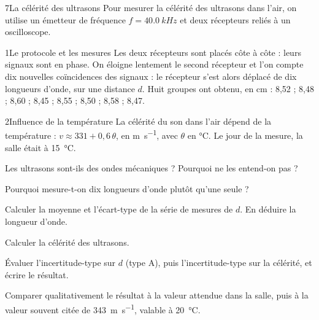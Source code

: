 

\begin{exoBac}{7}{La célérité des ultrasons}
Pour mesurer la célérité des ultrasons dans l'air, on utilise un émetteur de fréquence $f=\qty{40,0}{kHz}$ et deux récepteurs reliés à
un oscilloscope.
\begin{docu}{1}{Le protocole et les mesures}
Les deux récepteurs sont placés côte à côte : leurs signaux sont en phase. On éloigne lentement le second récepteur et l'on compte
dix nouvelles coïncidences des signaux : le récepteur s'est alors déplacé de dix longueurs d'onde, sur une distance $d$. Huit
groupes ont obtenu, en cm : 8,52 ; 8,48 ; 8,60 ; 8,45 ; 8,55 ; 8,50 ; 8,58 ; 8,47.
\end{docu}
\begin{docu}{2}{Influence de la température}
La célérité du son dans l'air dépend de la température : $v\approx331+0{,}6\,\theta$, en \unit{m.s^{-1}}, avec $\theta$ en \unit{\degreeCelsius}. Le jour de la
mesure, la salle était à \qty{15}{\degreeCelsius}.
\end{docu}
\begin{questions}
\item Les ultrasons sont-ils des ondes mécaniques ? Pourquoi ne les entend-on pas ?
\item Pourquoi mesure-t-on dix longueurs d'onde plutôt qu'une seule ?
\item Calculer la moyenne et l'écart-type de la série de mesures de $d$. En déduire la longueur d'onde.
\item Calculer la célérité des ultrasons.
\item Évaluer l'incertitude-type sur $d$ (type A), puis l'incertitude-type sur la célérité, et écrire le résultat.
\item \initiative Comparer qualitativement le résultat à la valeur attendue dans la salle, puis à la valeur souvent citée de
\qty{343}{m.s^{-1}}, valable à \qty{20}{\degreeCelsius}.
\end{questions}
\end{exoBac}

